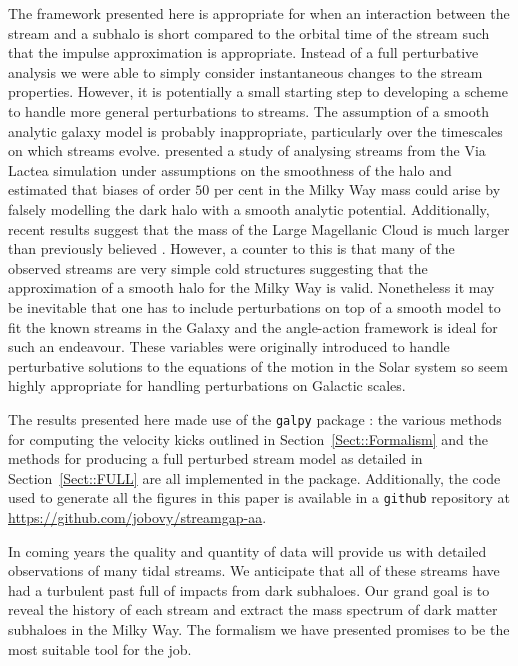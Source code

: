 \documentclass[useAMS,usenatbib,fleqn,a4paper]{mn2e}
\def\percent{\text{ per cent}}
\def\percent{\text{ per cent}}
\begin{document}
The framework presented here is appropriate for when an interaction between the stream and a subhalo is short compared to the orbital time of the stream such that the impulse approximation is appropriate. Instead of a full perturbative analysis we were able to simply consider instantaneous changes to the stream properties. However, it is potentially a small starting step to developing a scheme to handle more general perturbations to streams. The assumption of a smooth analytic galaxy model is probably inappropriate, particularly over the timescales on which streams evolve. \cite{Bonaca2014} presented a study of analysing streams from the Via Lactea simulation under assumptions on the smoothness of the halo and estimated that biases of order $50\percent$ in the Milky Way mass could arise by falsely modelling the dark halo with a smooth analytic potential. Additionally, recent results suggest that the mass of the Large Magellanic Cloud is much larger than previously believed \citep{Kallivayalil2013, Penarrubia2015}. However, a counter to this is that many of the observed streams are very simple cold structures suggesting that the approximation of a smooth halo for the Milky Way is valid. Nonetheless it may be inevitable that one has to include perturbations on top of a smooth model to fit the known streams in the Galaxy and the angle-action framework is ideal for such an endeavour. These variables were originally introduced to handle perturbative solutions to the equations of the motion in the Solar system so seem highly appropriate for handling perturbations on Galactic scales.

The results presented here made use of the \texttt{galpy} package \citep{galpy}: the various methods for computing the velocity kicks outlined in Section~\ref{Sect::Formalism} and the methods for producing a full perturbed stream model as detailed in Section~\ref{Sect::FULL} are all implemented in the package. Additionally, the code used to generate all the figures in this paper is available in a \texttt{github} repository at \href{https://github.com/jobovy/streamgap-aa}{https://github.com/jobovy/streamgap-aa}.

In coming years the quality and quantity of data will provide us with detailed observations of many tidal streams. We anticipate that all of these streams have had a turbulent past full of impacts from dark subhaloes. Our grand goal is to reveal the history of each stream and extract the mass spectrum of dark matter subhaloes in the Milky Way. The formalism we have presented promises to be the most suitable tool for the job.
\end{document}
